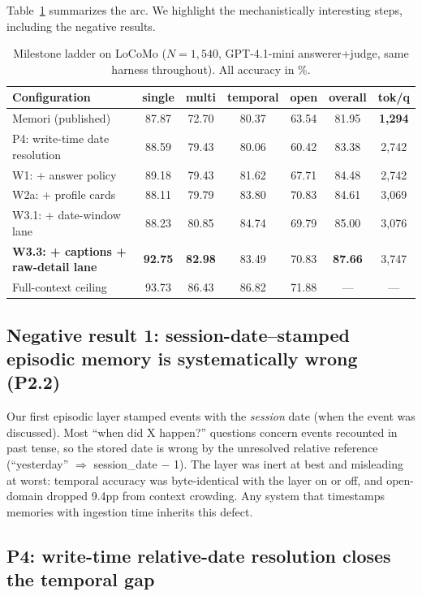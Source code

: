 \documentclass[11pt]{article}
\newcommand{\best}[1]{\textbf{#1}}
\begin{document}
Table~\ref{tab:ladder} summarizes the arc. We highlight the
mechanistically interesting steps, including the negative results.

\begin{table}[t]
\centering
\small
\caption{Milestone ladder on LoCoMo ($N{=}1{,}540$, GPT-4.1-mini
answerer+judge, same harness throughout). All accuracy in \%.}
\label{tab:ladder}
\begin{tabular}{lcccccc}
\toprule
Configuration & single & multi & temporal & open & \textbf{overall} & tok/q\\
\midrule
Memori (published) & 87.87 & 72.70 & 80.37 & 63.54 & 81.95 & \best{1{,}294}\\
\midrule
P4: write-time date resolution & 88.59 & 79.43 & 80.06 & 60.42 & 83.38 & 2{,}742\\
W1: + answer policy & 89.18 & 79.43 & 81.62 & 67.71 & 84.48 & 2{,}742\\
W2a: + profile cards & 88.11 & 79.79 & 83.80 & 70.83 & 84.61 & 3{,}069\\
W3.1: + date-window lane & 88.23 & 80.85 & 84.74 & 69.79 & 85.00 & 3{,}076\\
\textbf{W3.3: + captions + raw-detail lane} & \best{92.75} & \best{82.98} & 83.49 & 70.83 & \best{87.66} & 3{,}747\\
\midrule
Full-context ceiling & 93.73 & 86.43 & 86.82 & 71.88 & --- & ---\\
\bottomrule
\end{tabular}
\end{table}

\subsection{Negative result 1: session-date--stamped episodic memory
is systematically wrong (P2.2)}

Our first episodic layer stamped events with the \emph{session} date
(when the event was discussed). Most ``when did X happen?'' questions
concern events recounted in past tense, so the stored date is wrong by
the unresolved relative reference (``yesterday'' $\Rightarrow$
session\_date $-$ 1). The layer was inert at best and misleading at
worst: temporal accuracy was byte-identical with the layer on or off,
and open-domain dropped 9.4pp from context crowding. Any system that
timestamps memories with ingestion time inherits this defect.

\subsection{P4: write-time relative-date resolution closes the
temporal gap}
\end{document}
